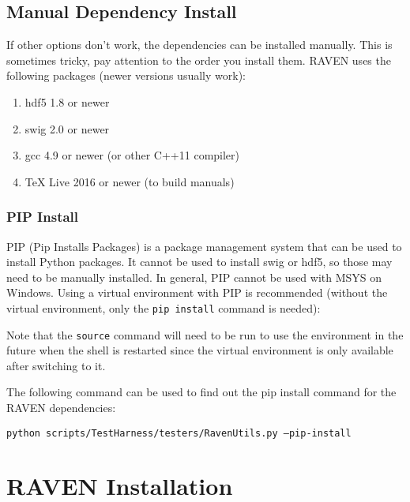 \subsection{Manual Dependency Install}
\label{sysprep_manual}

If other options don't work, the dependencies can be installed
manually.  This is sometimes tricky, pay attention to the order you
install them.  RAVEN uses the following packages (newer versions
usually work):

\begin{enumerate}
  
\item hdf5 1.8 or newer
\item swig 2.0 or newer
\item gcc 4.9 or newer (or other C++11 compiler)
\item TeX Live 2016 or newer (to build manuals)
\end{enumerate}

\goToRavenInstallation

\subsubsection{PIP Install}

PIP (Pip Installs Packages) is a package management system that can be
used to install Python packages.  It cannot be used to install swig or
hdf5, so those may need to be manually installed.  In general, PIP
cannot be used with MSYS on Windows.  Using a virtual environment with
PIP is recommended (without the virtual environment, only the
\texttt{pip install} command is needed):



Note that the \texttt{source} command will need to be run to use the
environment in the future when the shell is restarted since the
virtual environment is only available after switching to it.

The following command can be used to find out the pip install command
for the RAVEN dependencies:

\texttt{python scripts/TestHarness/testers/RavenUtils.py --pip-install}

\goToRavenInstallation


\section{RAVEN Installation}
\label{raven_installation}


